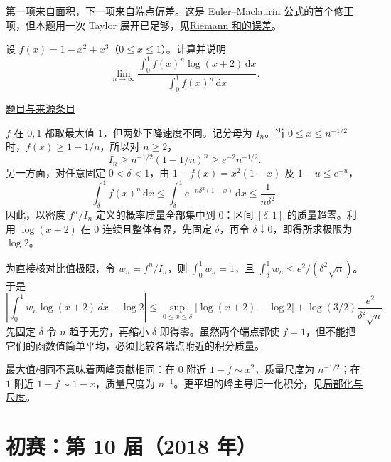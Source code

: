 \documentclass[UTF8,12pt,a4paper,fontset=fandol]{ctexart}
\begin{document}
\begin{remark}[方法与条件]第一项来自面积，下一项来自端点偏差。这是 Euler--Maclaurin 公式的首个修正项，但本题用一次 Taylor 展开已足够，见\hyperref[app:integration-riemann]{Riemann 和的误差}。\end{remark}

\begin{example}[来源序号6]\label{ex:pre09-math:6}\label{pr:pre09-math:6}

设 $f(x)=1-x^2+x^3$（$0\le x\le1$）。计算并说明
\[
\lim_{n\to\infty}
\frac{\int_0^1f(x)^n\log(x+2)\,\mathrm dx}{\int_0^1f(x)^n\,\mathrm dx}.
\]

\par\href{https://github.com/lzxcr/cmc-mathematics/blob/64916fa1fdbc3e444a652eca204d5669058ee321/src/problems/preliminary/09/06.md}{题目与来源条目}

\end{example}

\begin{solve}\label{ans:pre09-math:6}

$f$ 在 $0,1$ 都取最大值 $1$，但两处下降速度不同。记分母为 $I_n$。当 $0\le x\le n^{-1/2}$ 时，$f(x)\ge1-1/n$，所以对 $n\ge2$，
\[
I_n\ge n^{-1/2}(1-1/n)^n\ge e^{-2}n^{-1/2}.
\]
另一方面，对任意固定 $0<\delta<1$，由 $1-f(x)=x^2(1-x)$ 及 $1-u\le e^{-u}$，
\[
\int_\delta^1f(x)^n\,\mathrm dx
\le\int_\delta^1e^{-n\delta^2(1-x)}\,\mathrm dx
\le\frac1{n\delta^2}.
\]
因此，以密度 $f^n/I_n$ 定义的概率质量全部集中到 $0$：区间 $[\delta,1]$ 的质量趋零。利用 $\log(x+2)$ 在 $0$ 连续且整体有界，先固定 $\delta$，再令 $\delta\downarrow0$，即得所求极限为 $\boxed{\log2}$。

为直接核对比值极限，令 $w_n=f^n/I_n$，则 $\int_0^1w_n=1$，且 $\int_\delta^1w_n\le e^2/(\delta^2\sqrt n)$。于是
\[
\left|\int_0^1w_n\log(x+2)\,dx-\log2\right|
\le\sup_{0\le x\le\delta}|\log(x+2)-\log2|
+\log(3/2)\frac{e^2}{\delta^2\sqrt n}.
\]
先固定 $\delta$ 令 $n$ 趋于无穷，再缩小 $\delta$ 即得零。虽然两个端点都使 $f=1$，但不能把它们的函数值简单平均，必须比较各端点附近的积分质量。

\end{solve}

\begin{remark}[方法与条件]最大值相同不意味着两峰贡献相同：在 $0$ 附近 $1-f\sim x^2$，质量尺度为 $n^{-1/2}$；在 $1$ 附近 $1-f\sim1-x$，质量尺度为 $n^{-1}$。更平坦的峰主导归一化积分，见\hyperref[app:integration-local]{局部化与尺度}。\end{remark}

\section{初赛：第 10 届（2018 年）}
\end{document}
